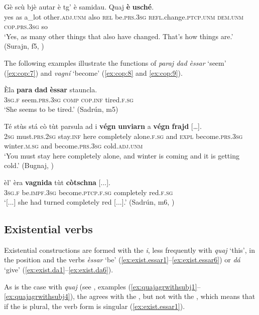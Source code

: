 \ea
\label{ex:cop:5}
\gll    Gè scù bjè autar è tg’ è samidau. Quaj \textbf{è} \textbf{usché}.\\
yes as a\_lot other.\textsc{adj.unm} also \textsc{rel} be.\textsc{prs.3sg} \textsc{refl.}change.\textsc{ptcp.unm}  \textsc{dem.unm} \textsc{cop.prs.3sg} so\\
\glt `Yes, as many other things that also have changed. That’s how things are.' (Surajn, f5, )
\z

The following examples illustrate the functions of \textit{paraj dad èssar} `seem' (\ref{ex:cop:7}) and \textit{vagní} `become' (\ref{ex:cop:8} and \ref{ex:cop:9}).

\ea
\label{ex:cop:7}
\gll Èla \textbf{para} \textbf{dad} \textbf{èssar} stauncla.   \\
\textsc{3sg.f} seem.\textsc{prs.3sg} \textsc{comp} \textsc{cop.inf} tired.\textsc{f.sg} \\
\glt `She seems to be tired.' (Sadrún, m5)
\z

\ea
\label{ex:cop:8}
\gll    Té stùs stá cò tùt parsula ad i \textbf{végn} \textbf{unviarn} a \textbf{végn} \textbf{frajd} […].\\
    \textsc{2sg} must.\textsc{prs.2sg} stay.\textsc{inf} here completely alone.\textsc{f.sg} and \textsc{expl} become.\textsc{prs.3sg} winter.\textsc{m.sg} and become.\textsc{prs.3sg} cold.\textsc{adj.unm}  \\
\glt `You must stay here completely alone, and winter is coming and it is getting cold.' (Bugnaj, \citealt[145]{Büchli1966})
\z

\ea
\label{ex:cop:9}
\gll  [...] èl’ èra \textbf{vagnida} tùt \textbf{còtschna} [...].\\
{} \textsc{3sg.f} be.\textsc{impf.3sg} become.\textsc{ptcp.f.sg} completely red.\textsc{f.sg}\\
\glt `[...] she had turned completely red [...].' (Sadrún, m6, )
\z

\subsection{Existential verbs}\label{sec:4.1.5}
Existential constructions are formed with the  \textit{i}, less frequently with \textit{quaj} `this', in the  position and the verbs \textit{èssar} `be' (\ref{ex:exist.essar1}--\ref{ex:exist.essar6}) or \textit{dá} `give' (\ref{ex:exist.da1}--\ref{ex:exist.da6}).

As is the case with \textit{quaj} (see , examples (\ref{ex:quajagrwithsubj1}--\ref{ex:quajagrwithsubj4}), the  agrees with the , but not with the , which means that if the  is plural, the verb form is singular (\ref{ex:exist.essar1}).


